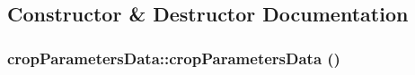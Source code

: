 \subsection{Constructor \& Destructor Documentation}
\hypertarget{classcrop_parameters_data_a883a119f0a6e013cb03fce35a670675e}{
\subsubsection[{cropParametersData}]{\setlength{\rightskip}{0pt plus 5cm}cropParametersData::cropParametersData ()}}
\label{classcrop_parameters_data_a883a119f0a6e013cb03fce35a670675e}


